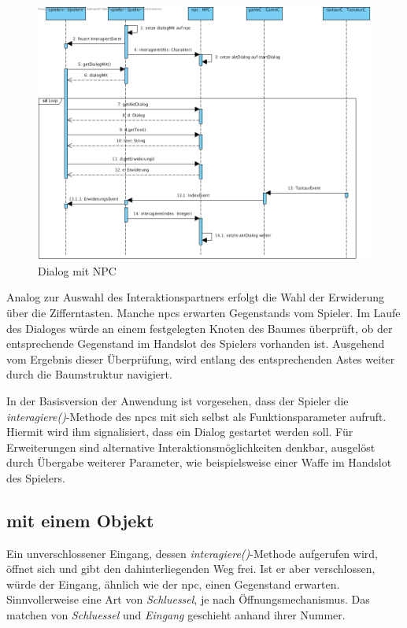 \begin{figure}[h]
	\begin{center}
		\includegraphics[trim=0cm 0cm 0cm 0cm, clip=true, width=13cm]{kapitel/laufzeitsicht/dialogMitNPC.png}
	\end{center}
	\caption{Dialog mit NPC}
	\label{fig:dialognpc_uml}
\end{figure}

Analog zur Auswahl des Interaktionspartners erfolgt die Wahl der \gls{Erwiderung} über die Zifferntasten.
Manche \gls{npcs} erwarten \glspl{Gegenstand} vom \gls{Spieler}. Im Laufe des \gls{Dialog}es würde an einem festgelegten 
Knoten des Baumes überprüft, ob der entsprechende \gls{Gegenstand} im Handslot des \gls{Spieler}s vorhanden ist.
Ausgehend vom Ergebnis dieser Überprüfung, wird entlang des entsprechenden Astes weiter durch die 
Baumstruktur navigiert.

In der Basisversion der Anwendung ist vorgesehen, dass der \gls{Spieler} die \textit{interagiere()}-Methode des \gls{npcs} 
mit sich selbst als Funktionsparameter aufruft. Hiermit wird ihm signalisiert, dass ein \gls{Dialog} 
gestartet werden soll. Für Erweiterungen sind alternative Interaktionsmöglichkeiten denkbar, 
ausgelöst durch Übergabe weiterer Parameter, wie beispielsweise einer Waffe im Handslot des \gls{Spieler}s.

\newpage

\subsection{mit einem Objekt}
Ein unverschlossener \gls{Eingang}, dessen \textit{interagiere()}-Methode aufgerufen wird, öffnet sich und gibt den 
dahinterliegenden Weg frei.
Ist er aber verschlossen, würde der \gls{Eingang}, ähnlich wie der \gls{npc}, einen \gls{Gegenstand} erwarten. 
Sinnvollerweise eine Art von \textit{Schluessel}, je nach Öffnungsmechanismus. Das matchen von \textit{Schluessel} und 
\textit{Eingang} geschieht anhand ihrer Nummer.


